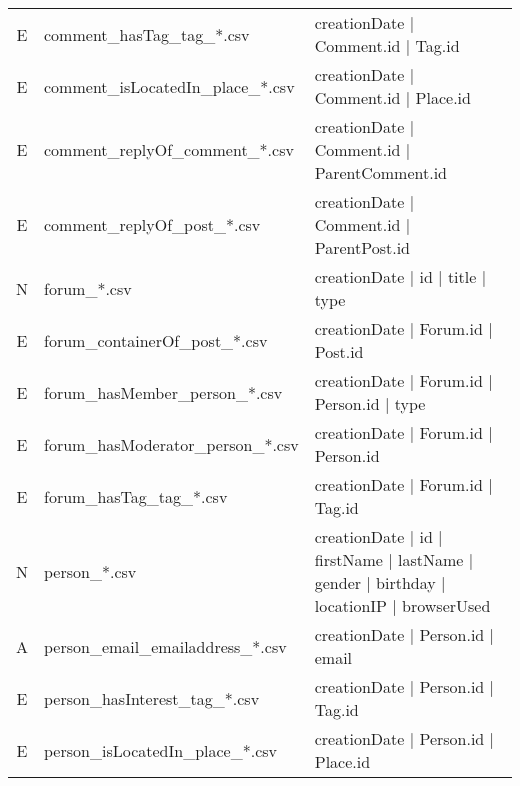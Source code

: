 \begin{table}[htb]
\begin{tabular}{|c|l|l|}
        E                    & comment\_hasTag\_tag\_*.csv             & creationDate | Comment.id | Tag.id                                                                \\
        E                    & comment\_isLocatedIn\_place\_*.csv      & creationDate | Comment.id | Place.id                                                              \\
        E                    & comment\_replyOf\_comment\_*.csv        & creationDate | Comment.id | ParentComment.id                                                      \\
        E                    & comment\_replyOf\_post\_*.csv           & creationDate | Comment.id | ParentPost.id                                                         \\
        \hline
        N                    & forum\_*.csv                            & creationDate | id | title | type                                                                  \\
        E                    & forum\_containerOf\_post\_*.csv         & creationDate | Forum.id | Post.id                                                                 \\
        E                    & forum\_hasMember\_person\_*.csv         & creationDate | Forum.id | Person.id | type                                                        \\
        E                    & forum\_hasModerator\_person\_*.csv      & creationDate | Forum.id | Person.id                                                               \\
        E                    & forum\_hasTag\_tag\_*.csv               & creationDate | Forum.id | Tag.id                                                                  \\
        \hline
        N                    & person\_*.csv                           & creationDate | id | firstName | lastName | gender | birthday | locationIP | browserUsed           \\
        A                    & person\_email\_emailaddress\_*.csv      & creationDate | Person.id | email                                                                  \\
        E                    & person\_hasInterest\_tag\_*.csv         & creationDate | Person.id | Tag.id                                                                 \\
        E                    & person\_isLocatedIn\_place\_*.csv       & creationDate | Person.id | Place.id                                                               \\

\end{tabular}
\end{table}
